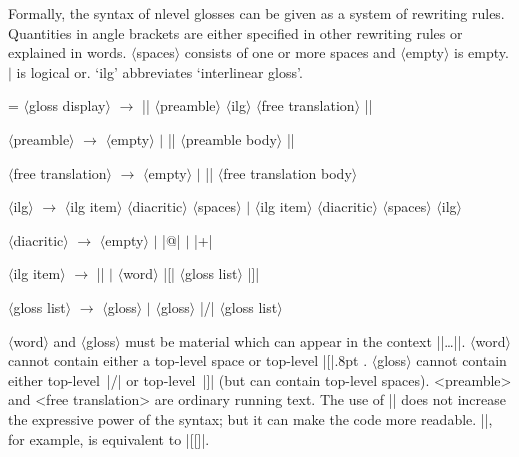 
\def\<#1>{$\langle$#1$\rangle$}

Formally, the syntax of nlevel glosses can be given as a system of
rewriting rules.  Quantities in angle brackets are either specified in
other rewriting rules or explained in words. \<spaces> consists of one
or more spaces and \<empty> is empty.  $\vert$ is logical or.  `ilg'
abbreviates `interlinear gloss'.

\bigskip
\begingroup
\leftskip=\parindent
{}
\parindent=0pt
\<gloss display> $\to$ |\begingl| \<preamble> \<ilg>
\<free translation> |\endgl|

\<preamble> $\to$ \<empty> $\vert$ |\glpreamble| \<preamble body>
|\endpreamble|

\<free translation> $\to$ \<empty> $\vert$ |\glft| \<free translation body>

\<ilg> $\to$ \<ilg item> \<diacritic> \<spaces> $\vert$ \<ilg item>
\<diacritic> \<spaces> \<ilg>

\<diacritic> $\to$ \<empty> $\vert$ |@| $\vert$ |+|

\<ilg item> $\to$ || $\vert$
\<word> |[| \<gloss list> |]|

\<gloss list> $\to$ \<gloss> $\vert$ \<gloss> |/| \<gloss list>

\bigskip
\endgroup
\noindent
\<word> and \<gloss> must be material which can appear in the context
|\hbox{|\dots|}|. \<word> cannot contain either a top-level space or
top-level |[|\kern.8pt . \<gloss> cannot contain either top-level~|/|
or top-level~|]| (but can contain top-level spaces).  <preamble> and
<free translation> are ordinary running text.  The use of |\nogloss|
does not increase the expressive power of the syntax; but it can make
the code more readable.  |\nogloss{[}|, for example, is equivalent to
|{[}[]|.

%
%

